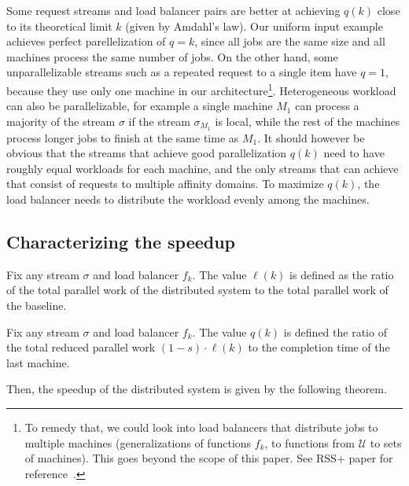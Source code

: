 Some request streams and load balancer pairs are better at achieving $q(k)$ close to its theoretical limit $k$ (given by Amdahl's law). Our uniform input example achieves perfect parellelization of $q=k$, since all jobs are the same size and all machines process the same number of jobs. On the other hand, some unparallelizable streams such as a repeated request to a single item have $q=1$, because they use only one machine in our architecture\footnote{To remedy that, we could look into load balancers that distribute jobs to multiple machines (generalizations of functions $f_k$, to functions from $\mathcal{U}$ to sets of machines). This goes beyond the scope of this paper. See RSS+ paper for reference~\cite{10.1145/3359989.3365412}.}.
Heterogeneous workload can also be parallelizable, for example a single machine $M_1$ can process a majority of the stream $\sigma$ if the stream $\sigma_{M_1}$ is local, while the rest of the machines process longer jobs to finish at the same time as $M_1$.
It should however be obvious that the streams that achieve good parallelization $q(k)$ need to have roughly equal workloads for each machine, and the only streams that can achieve that consist of requests to multiple affinity domains.
To maximize $q(k)$, the load balancer needs to distribute the workload evenly among the machines.



\subsection{Characterizing the speedup}

\begin{definition}
	\label{def:ell}
Fix any stream $\sigma$ and load balancer $f_k$. The value $\ell(k)$ is defined as the ratio of the total parallel work of the distributed system to the total parallel work of the baseline.
\end{definition}

\begin{definition}
	\label{def:q}
Fix any stream $\sigma$ and load balancer $f_k$. 
The value $q(k)$ is defined the ratio of the total reduced parallel work $(1-s)\cdot\ell(k)$ to the completion time of the last machine.
\end{definition}

Then, the speedup of the distributed system is given by the following theorem.

